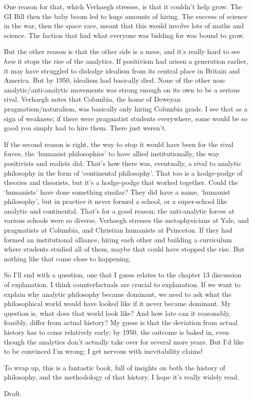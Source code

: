 \documentclass[
  11pt,
  letterpaper,
  DIV=11,
  numbers=noendperiod,
  twoside]{scrartcl}
\begin{document}
One reason for that, which Verhaegh stresses, is that it couldn't help
grow. The GI Bill then the baby boom led to huge amounts of hiring. The
success of science in the war, then the space race, meant that this
would involve lots of maths and science. The faction that had what
everyone was bidding for was bound to grow.

But the other reason is that the other side is a mess, and it's really
hard to see \emph{how} it stops the rise of the analytics. If positivism
had arisen a generation earlier, it may have struggled to dislodge
idealism from its central place in Britain and America. But by 1950,
idealism had basically died. None of the other
non-analytic/anti-analytic movements was strong enough on its own to be
a serious rival. Verhaegh notes that Columbia, the home of Deweyan
pragmatism/naturalism, was basically only hiring Columbia grads. I see
that as a sign of weakness; if there were pragmatist students
everywhere, some would be so good you simply had to hire them. There
just weren't.

If the second reason is right, the way to stop it would have been for
the rival forces, the `humanist philosophies' to have allied
institutionally, the way positivists and realists did. That's how there
was, eventually, a rival to analytic philosophy in the form of
`continental philosophy'. That too is a hodge-podge of theories and
theorists, but it's a hodge-podge that worked together. Could the
`humanists' have done something similar? They did have a name, `humanist
philosophy', but in practice it never formed a school, or a super-school
like analytic and continental. That's for a good reason: the
anti-analytic forces at various schools were so diverse. Verhaegh
stresses the metaphysicians at Yale, and pragmatists at Columbia, and
Christian humanists at Princeton. If they had formed an institutional
alliance, hiring each other and building a curriculum where students
studied all of them, maybe that could have stopped the rise. But nothing
like that came close to happening.

So I'll end with a question, one that I guess relates to the chapter 13
discussion of explanation. I think counterfactuals are crucial to
explanation. If we want to explain why analytic philosophy became
dominant, we need to ask what the philosophical world would have looked
like if it never became dominant. My question is, what does that world
look like? And how late can it reasonably, feasibly, differ from actual
history? My guess is that the deviation from actual history has to come
relatively early; by 1950, the outcome is baked in, even though the
analytics don't actually take over for several more years. But I'd like
to be convinced I'm wrong; I get nervous with inevitability claims!

To wrap up, this is a fantastic book, full of insights on both the
history of philosophy, and the methodology of that history. I hope it's
really widely read.



\vspace{12pt} \noindent Draft.
\end{document}
